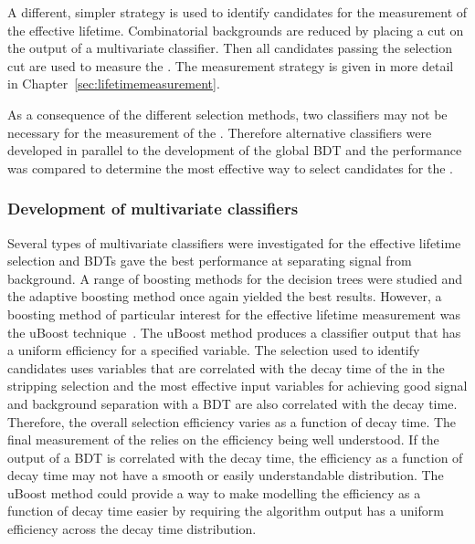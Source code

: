A different, simpler strategy is used to identify candidates for the measurement of the \bsmumu effective lifetime. Combinatorial backgrounds are reduced by placing a cut on the output of a multivariate classifier. Then all candidates passing the selection cut are used to measure the \el. The measurement strategy is given in more detail in Chapter~\ref{sec:lifetimemeasurement}. 

As a consequence of the different selection methods, two classifiers may not be necessary for the measurement of the \el. Therefore alternative classifiers were developed in parallel to the development of the global BDT and the performance was compared to determine the most effective way to select candidates for the \elm. 

\subsubsection{Development of \el multivariate classifiers}
\label{sec:dev_BDTs}
Several types of multivariate classifiers were investigated for the effective lifetime selection and BDTs gave the best performance at separating signal from background. A range of boosting methods for the decision trees were studied and the adaptive boosting method once again yielded the best results. %
However, a boosting method of particular interest for the effective lifetime measurement was the uBoost technique~\cite{Stevens:2013dya}. The uBoost method produces a classifier output that has a uniform efficiency for a specified variable. The selection used to identify \bsmumu candidates uses variables that are correlated with the decay time of the \bs in the stripping selection and the most effective input variables for achieving good signal and background separation with a BDT are also correlated with the decay time. Therefore, the overall selection efficiency varies as a function of decay time. The final measurement of the \el relies on the efficiency being well understood. If the output of a BDT is correlated with the \bs decay time, the efficiency as a function of decay time may not have a smooth or easily understandable distribution. The uBoost method could provide a way to make modelling the efficiency as a function of decay time easier by requiring the algorithm output has a uniform efficiency across the decay time distribution.

